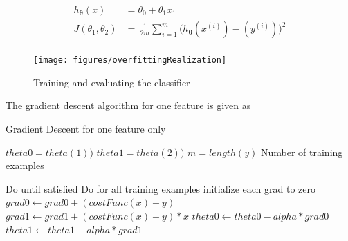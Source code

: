 \begin{align}
\label{eqn:linearRegressionTwoFeaturesSummary}
\begin{split}
h_{{\bm{\theta}}}(x) & = \theta_0 + \theta_1 x_1 
\\
J(\theta_1,\theta_2)
 & =\,
\frac{1}{2m} \sum\limits_{i=1}^{m} \Big(h_{\bm{\theta}}(x^{(i)}) - (y^{(i)})\Big)^2  
\end{split}
\end{align}


\begin{landscape}
\begin{figure}
\begin{center}
\texttt{[image: figures/overfittingRealization]}    %
\caption{Training and evaluating the classifier} 
\label{fig:trainingAndEvaluation}
\end{center}
\end{figure}
\end{landscape}




The gradient descent algorithm for one feature is given as 

 \begin{algorithm}
   \caption{Gradient Descent for one feature only}
    \begin{algorithmic}[1]
      

        \State $theta0 = theta(1))$  
        \State $theta1 = theta(2))$  
        \State $m = length(y)$ \Comment Number of training examples

         \Comment Do until satisfied
                     \Comment Do for all training examples
                         \State initialize each grad to zero
           	 	\State $grad0 \leftarrow grad0 + (costFunc(x) - y)$
		         \State $grad1 \leftarrow grad1 + (costFunc(x) - y) * x$
                    \EndFor
                    \State $theta0 \leftarrow theta0 - alpha * grad0$
                    \State $theta1 \leftarrow theta1 - alpha * grad1$
        \EndFor
       \EndFunction

\end{algorithmic}
\end{algorithm}
 
